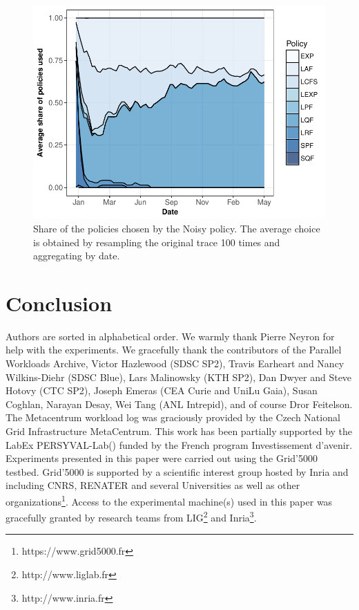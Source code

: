 \documentclass[sigconf]{acmart}
\begin{document}
\begin{figure}[ht]
  \centering
  \includegraphics[scale=0.6]{figures/mosaic-UniLu-Ga.pdf}
  \caption{Share of the policies chosen by the Noisy policy. The average
  choice is obtained by resampling the original trace 100 times and
  aggregating by date.}
  \label{fig:mosn}
\end{figure}

\section{Conclusion}
\label{sec:ccl}

\begin{acks}

Authors are sorted in alphabetical order. We warmly thank Pierre Neyron for help with the experiments. We gracefully thank the contributors
of the Parallel Workloads Archive, Victor Hazlewood (SDSC SP2), Travis Earheart
and Nancy Wilkins-Diehr (SDSC Blue), Lars Malinowsky (KTH SP2), Dan Dwyer and
Steve Hotovy (CTC SP2), Joseph Emeras (CEA Curie and UniLu Gaia), Susan
Coghlan, Narayan Desay, Wei Tang (ANL Intrepid), and of course Dror Feitelson.
The Metacentrum workload log was graciously provided by the Czech National Grid
Infrastructure MetaCentrum. This work has been partially supported by the LabEx
PERSYVAL-Lab() funded by
the French program Investissement d'avenir. Experiments presented in this paper
were carried out using the Grid'5000 testbed. Grid'5000 is supported by a
scientific interest group hosted by Inria and including CNRS, RENATER and
several Universities as well as other
organizations\footnote{https://www.grid5000.fr}.  Access to the experimental
machine(s) used in this paper was gracefully granted by research teams from
LIG\footnote{http://www.liglab.fr} and Inria\footnote{http://www.inria.fr}.

\end{acks}
\end{document}
